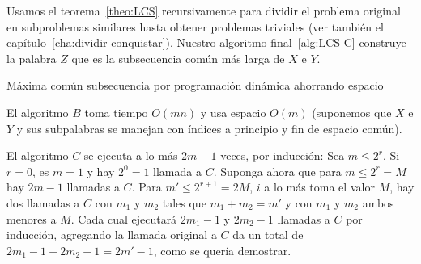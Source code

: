   Usamos el teorema~\ref{theo:LCS} recursivamente
  para dividir el problema original en subproblemas similares
  hasta obtener problemas triviales
  (ver también el capítulo~\ref{cha:dividir-conquistar}).
  Nuestro algoritmo final~\ref{alg:LCS-C}
  construye la palabra \(Z\) que es la subsecuencia común más larga
  de \(X\) e \(Y\).
  \begin{algorithm}
    \DontPrintSemicolon\Indp


    \caption{Máxima común subsecuencia por programación dinámica
             ahorrando espacio}
    \label{alg:LCS-C}
  \end{algorithm}
  El algoritmo \(B\) toma tiempo \(O(m n)\)
  y usa espacio \(O(m)\)
  (suponemos que \(X\) e \(Y\) y sus subpalabras
   se manejan con índices a principio y fin de espacio común).

  El algoritmo \(C\) se ejecuta a lo más \(2 m - 1\) veces,
  por inducción:
  Sea \(m \le 2^r\).
  Si \(r = 0\),
  es \(m = 1\) y hay \(2^0 = 1\) llamada a \(C\).
  Suponga ahora que para \(m \le 2^r = M\) hay \(2 m - 1\) llamadas a \(C\).
  Para \(m' \le 2^{r + 1} = 2 M\),
  \(i\) a lo más toma el valor \(M\),
  hay dos llamadas a \(C\) con \(m_1\) y \(m_2\) tales que \(m_1 + m_2 = m'\)
  y con \(m_1\) y \(m_2\) ambos menores a \(M\).
  Cada cual ejecutará \(2 m_1 - 1\) y \(2 m_2 - 1\) llamadas a \(C\)
  por inducción,
  agregando la llamada original a \(C\)
  da un total de \(2 m_1 - 1 + 2 m_2 + 1 = 2 m' - 1\),
  como se quería demostrar.

